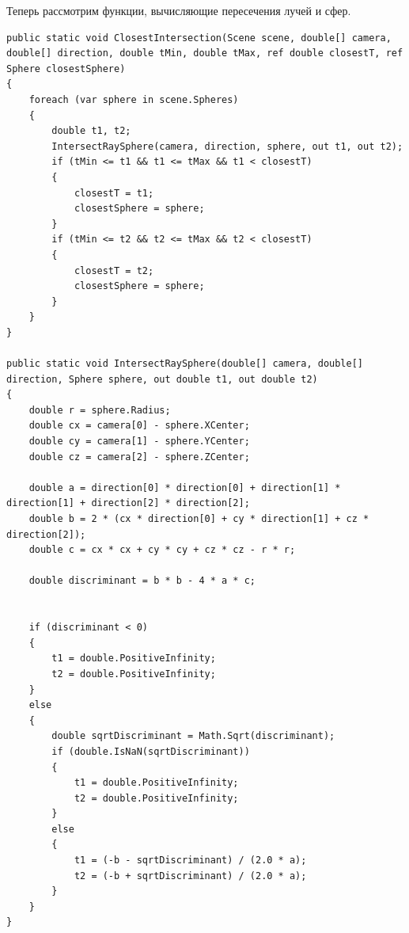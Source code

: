 Теперь рассмотрим функции, вычисляющие пересечения лучей и сфер.
\begin{lstlisting}[caption={Функции для нахождения ближайшего пересечения луча с какой-либо сферой на сцене.}, label={lst:3-2}]
public static void ClosestIntersection(Scene scene, double[] camera, double[] direction, double tMin, double tMax, ref double closestT, ref Sphere closestSphere)
{
	foreach (var sphere in scene.Spheres)
	{
		double t1, t2;
		IntersectRaySphere(camera, direction, sphere, out t1, out t2);
		if (tMin <= t1 && t1 <= tMax && t1 < closestT)
		{
			closestT = t1;
			closestSphere = sphere;
		}
		if (tMin <= t2 && t2 <= tMax && t2 < closestT)
		{
			closestT = t2;
			closestSphere = sphere;
		}
	}
}

public static void IntersectRaySphere(double[] camera, double[] direction, Sphere sphere, out double t1, out double t2)
{
	double r = sphere.Radius;
	double cx = camera[0] - sphere.XCenter;
	double cy = camera[1] - sphere.YCenter;
	double cz = camera[2] - sphere.ZCenter;
	
	double a = direction[0] * direction[0] + direction[1] * direction[1] + direction[2] * direction[2];
	double b = 2 * (cx * direction[0] + cy * direction[1] + cz * direction[2]);
	double c = cx * cx + cy * cy + cz * cz - r * r;
	
	double discriminant = b * b - 4 * a * c;
	
	
	if (discriminant < 0)
	{
		t1 = double.PositiveInfinity;
		t2 = double.PositiveInfinity;
	}
	else
	{
		double sqrtDiscriminant = Math.Sqrt(discriminant);
		if (double.IsNaN(sqrtDiscriminant))
		{
			t1 = double.PositiveInfinity;
			t2 = double.PositiveInfinity;
		}
		else
		{
			t1 = (-b - sqrtDiscriminant) / (2.0 * a);
			t2 = (-b + sqrtDiscriminant) / (2.0 * a);
		}
	}
}
\end{lstlisting}

